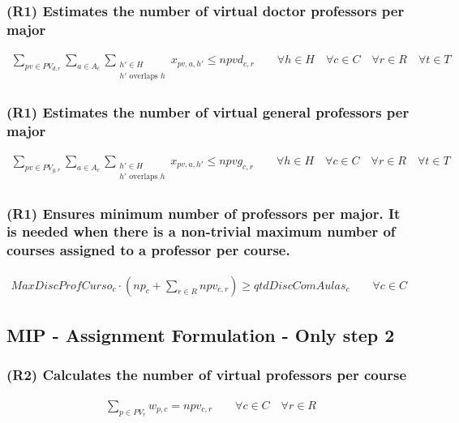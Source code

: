 \subsubsection{(R1) Estimates the number of virtual doctor professors per major}
\begin{eqnarray}
\sum\limits_{pv \in PV_{d,r}}\sum\limits_{a \in A_{c}}\sum\limits_{\substack {h' \in H \\ h'\mbox{ overlaps }h}} x_{pv,a,h'} \le npvd_{c,r} \nonumber \qquad 
\forall h \in H \quad
\forall c \in C \quad
\forall r \in R \quad
\forall t \in T
\end{eqnarray}

\subsubsection{(R1) Estimates the number of virtual general professors per major}
\begin{eqnarray}
\sum\limits_{pv \in PV_{g,r}}\sum\limits_{a \in A_{c}}\sum\limits_{\substack {h' \in H \\ h'\mbox{ overlaps }h}} x_{pv,a,h'} \le npvg_{c,r} \nonumber \qquad 
\forall h \in H \quad
\forall c \in C \quad
\forall r \in R \quad
\forall t \in T
\end{eqnarray}

\subsubsection{(R1) Ensures minimum number of professors per major. It is needed when there is a non-trivial maximum number of courses assigned to a professor per course.}
\begin{eqnarray}
MaxDiscProfCurso_{c} \cdot (np_{c} + \sum\limits_{r \in R} npv_{c,r}) \ge qtdDiscComAulas_{c} \nonumber \qquad 
\forall c \in C \quad
\end{eqnarray}


\subsection{MIP - Assignment Formulation - Only step 2}

\subsubsection{(R2) Calculates the number of virtual professors per course}
\begin{eqnarray}
\sum\limits_{p \in PV_{r}} w_{p,c} = npv_{c,r} \nonumber \qquad 
\forall c \in C \quad
\forall r \in R
\end{eqnarray}

